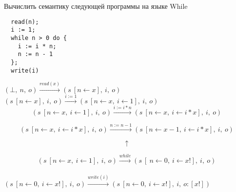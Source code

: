 \newpage

\begin{problem}
  Вычислить семантику следующей программы на языке While
  
  \begin{lstlisting}
  read(n);
  i := 1;
  while n > 0 do {
    i := i * n;
    n := n - 1
  };
  write(i)
  \end{lstlisting}
\end{problem}

$(\bot,\ n,\ o) \xrightarrow{read(x)} (s\ [n \gets x],\ i,\ o)$ \\

$(s\ [n \gets x],\ i,\ o) \xrightarrow{i := 1} (s\ [n \gets x,\ i \gets 1],\ i,\ o)$ \\

\[(s\ [n \gets x,\ i \gets 1],\ i,\ o) \xrightarrow{i := i * n} (s\ [n \gets x,\ i \gets i*x],\ i,\ o)\]

\[(s\ [n \gets x,\ i \gets i*x],\ i,\ o) \xrightarrow{n := n - 1} (s\ [n \gets x - 1,\ i \gets i*x],\ i,\ o)\]

\[\uparrow\]

\[(s\ [n \gets x,\ i \gets 1],\ i,\ o) \xrightarrow{while} (s\ [\ n \gets 0,\ i \gets x!],\ i,\ o)\] \\

$(s\ [n \gets 0,\ i \gets x!],\ i,\ o) \xrightarrow{write(i)} (s\ [n \gets 0,\ i \gets x!],\ i,\ o:[x!])$